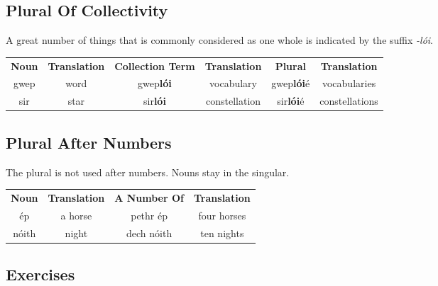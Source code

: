 \subsection{Plural Of Collectivity}

A great number of things that is commonly considered as one whole is indicated by the suffix \textit{-l\'{o}i}.
\begin{table}[H]
\centering
\begin{tabular}{cccccc}
  \toprule
  \textbf{Noun} & \textbf{Translation} & \textbf{Collection Term} & \textbf{Translation} & \textbf{Plural} & \textbf{Translation}\\
  \cmidrule(lr){1-1}\cmidrule(lr){2-2}\cmidrule(lr){3-3}\cmidrule(lr){4-4}\cmidrule(lr){5-5}\cmidrule(lr){6-6}
  gwep & word & gwep\textbf{l\'{o}i} & vocabulary & gwep\textbf{l\'{o}i}\'{e} & vocabularies\\
  sir & star & sir\textbf{l\'{o}i} & constellation & sir\textbf{l\'{o}i}\'{e} & constellations\\
  \bottomrule
\end{tabular}
\label{example_plural_one_whole}
\end{table}

\subsection{Plural After Numbers}

The plural is not used after numbers. Nouns stay in the singular.
\begin{table}[H]
\centering
\begin{tabular}{cccc}
  \toprule
  \textbf{Noun} & \textbf{Translation} & \textbf{A Number Of} & \textbf{Translation}\\
  \cmidrule(lr){1-1}\cmidrule(lr){2-2}\cmidrule(lr){3-3}\cmidrule(lr){4-4}
  \'{e}p & a horse & pethr \'{e}p & four horses\\
  n\'{o}ith & night & dech n\'{o}ith & ten nights\\
  \bottomrule
\end{tabular}
\label{example_plural_one_whole}
\end{table}

\newpage
\subsection{Exercises}

